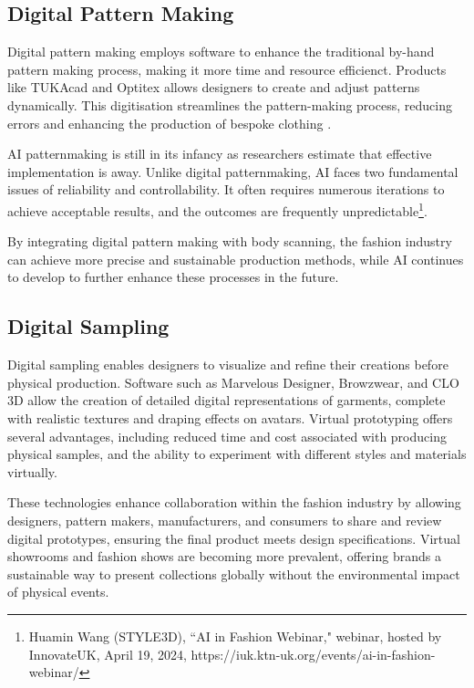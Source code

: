 \subsection{Digital Pattern Making}
Digital pattern making employs software to enhance the traditional by-hand pattern making process, making it more time and resource efficienct. Products like TUKAcad and Optitex allows designers to create and adjust patterns dynamically. This digitisation streamlines the pattern-making process, reducing errors and enhancing the production of bespoke clothing \cite{kim_garment_2003}.

AI patternmaking is still in its infancy as researchers estimate that effective implementation is  away. Unlike digital patternmaking, AI faces two fundamental issues of reliability and controllability. It often requires numerous iterations to achieve acceptable results, and the outcomes are frequently unpredictable\footnote{Huamin Wang (STYLE3D), ``AI in Fashion Webinar," webinar, hosted by InnovateUK, April 19, 2024, https://iuk.ktn-uk.org/events/ai-in-fashion-webinar/}.

By integrating digital pattern making with body scanning, the fashion industry can achieve more precise and sustainable production methods, while AI continues to develop to further enhance these processes in the future.

\subsection{Digital Sampling}
Digital sampling enables designers to visualize and refine their creations before physical production. Software such as Marvelous Designer, Browzwear, and CLO 3D \cite{noauthor_2d_2024} allow the creation of detailed digital representations of garments, complete with realistic textures and draping effects on avatars. Virtual prototyping offers several advantages, including reduced time and cost associated with producing physical samples, and the ability to experiment with different styles and materials virtually.

These technologies enhance collaboration within the fashion industry by allowing designers, pattern makers, manufacturers, and consumers to share and review digital prototypes, ensuring the final product meets design specifications. Virtual showrooms and fashion shows are becoming more prevalent, offering brands a sustainable way to present collections globally without the environmental impact of physical events.

